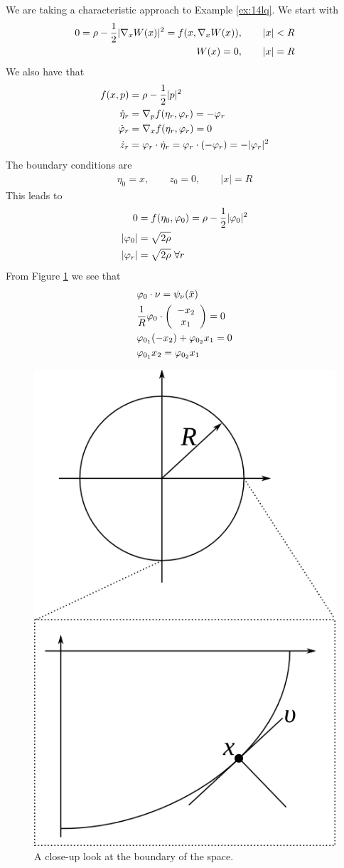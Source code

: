 \begin{example}
We are taking a characteristic approach to Example \ref{ex:14lq}. We start with
\begin{align*}
0 = \rho - \frac{1}{2}|\nabla_xW(x)|^2 = f(x,\nabla_xW(x))&, \qquad |x|<R \\
W(x) = 0&, \qquad |x| = R
\end{align*}
We also have that
\begin{align*}
f(x,p) &= \rho-\frac{1}{2}|p|^2 \\
\dot{\eta}_r &= \nabla_pf(\eta_r,\varphi_r) = -\varphi_r \\
\dot{\varphi}_r &= \nabla_xf(\eta_r,\varphi_r) = 0 \\
\dot{z}_r &= \varphi_r\cdot\dot{\eta}_r = \varphi_r\cdot(-\varphi_r) = -|\varphi_r|^2
\end{align*}
The boundary conditions are
\begin{align*}
\eta_0 = x, \qquad z_0=0, \qquad |x|=R
\end{align*}
This leads to
\begin{align}
\label{eq:15vpr}
0 &= f(\eta_0,\varphi_0) = \rho-\frac{1}{2}|\varphi_0|^2 \nonumber \\
|\varphi_0| &= \sqrt{2\rho} \nonumber \\
|\varphi_r| &= \sqrt{2\rho} ~\forall r
\end{align}
From Figure \ref{fig:15circlezoom} we see that
\begin{align}
\label{eq:15vpo}
&\varphi_0\cdot\nu = \psi_\nu(\bar{x}) \nonumber \\
&\frac{1}{R}\varphi_0\cdot\left(\begin{array}{c} -x_2 \\ x_1 \end{array}\right) = 0 \nonumber \\
&\varphi_{0_1}(-x_2) + \varphi_{0_2}x_1 = 0 \nonumber \\
&\varphi_{0_1}x_2 = \varphi_{0_2}x_1
\end{align}

\begin{figure}[ht!]
	\centering
	\includegraphics[width=.15\textwidth]{images/15circlezoom}
	\caption{A close-up look at the boundary of the space.}
	\label{fig:15circlezoom}
\end{figure}


\end{example}
